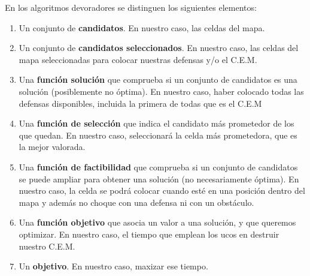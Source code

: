 En los algoritmos devoradores se distinguen los siguientes elementos:
\begin{enumerate}
    \item Un conjunto de \textbf{candidatos}. 
    En nuestro caso, las celdas del mapa.
    \item Un conjunto de \textbf{candidatos seleccionados}. 
    En nuestro caso, las celdas del mapa seleccionadas para colocar nuestras defensas y/o el C.E.M.
    \item Una \textbf{función solución} que comprueba si un conjunto de candidatos es una solución (posiblemente no óptima). 
    En nuestro caso, haber colocado todas las defensas disponibles, incluida la primera de todas que es el C.E.M
    \item Una \textbf{función de selección} que indica el candidato más prometedor de los que quedan. 
    En nuestro caso, seleccionará la celda más prometedora, que es la mejor valorada.
    \item Una \textbf{función de factibilidad} que comprueba si un conjunto de candidatos se puede ampliar para obtener una solución (no necesariamente óptima).
    En nuestro caso, la celda se podrá colocar cuando esté en una posición dentro del mapa y además no choque con una defensa ni con un obstáculo.
    \item Una \textbf{función objetivo} que asocia un valor a una solución, y que queremos optimizar. 
    En nuestro caso, el tiempo que emplean los ucos en destruir nuestro C.E.M.
    \item Un \textbf{objetivo}. En nuestro caso, maxizar ese tiempo.
\end{enumerate}
